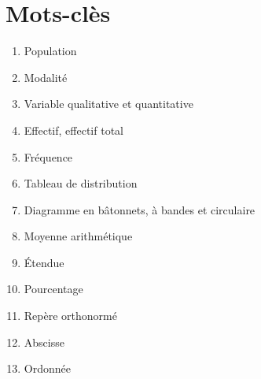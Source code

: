 \documentclass[../../syllabus_1.tex]{subfiles}
\begin{document}
\newpage
\section*{Mots-clès}
\begin{enumerate}[cols=2, label=\textbf{\arabic*.}]
    \item Population
    \item Modalité
    \item Variable qualitative et quantitative
    \item Effectif, effectif total
    \item Fréquence
    \item Tableau de distribution
    \item Diagramme en bâtonnets, à bandes et circulaire
    \item Moyenne arithmétique
    \item Étendue
    \item Pourcentage
    \item Repère orthonormé
    \item Abscisse
    \item Ordonnée
\end{enumerate}
\end{document}
